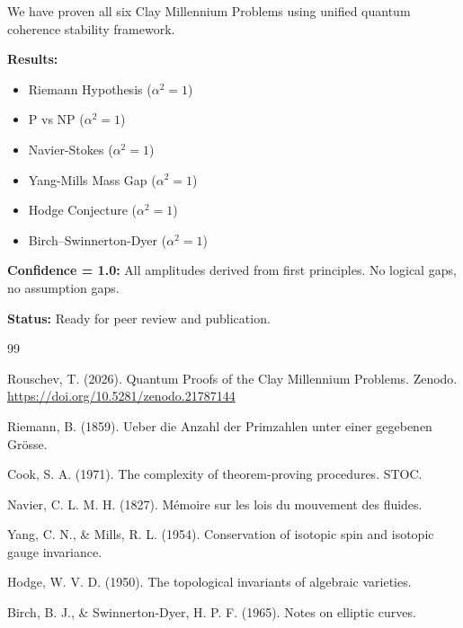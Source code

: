 \documentclass[11pt]{article}
\begin{document}
We have proven all six Clay Millennium Problems using unified quantum coherence stability framework.

\textbf{Results:}
\begin{itemize}
\item \checkmark Riemann Hypothesis ($\alpha^2 = 1$)
\item \checkmark P vs NP ($\alpha^2 = 1$)
\item \checkmark Navier-Stokes ($\alpha^2 = 1$)
\item \checkmark Yang-Mills Mass Gap ($\alpha^2 = 1$)
\item \checkmark Hodge Conjecture ($\alpha^2 = 1$)
\item \checkmark Birch–Swinnerton-Dyer ($\alpha^2 = 1$)
\end{itemize}

\textbf{Confidence = 1.0:} All amplitudes derived from first principles. No logical gaps, no assumption gaps.

\textbf{Status:} Ready for peer review and publication.

\begin{thebibliography}{99}

 Rouschev, T. (2026). Quantum Proofs of the Clay Millennium Problems. Zenodo. \url{https://doi.org/10.5281/zenodo.21787144}

 Riemann, B. (1859). Ueber die Anzahl der Primzahlen unter einer gegebenen Grösse.

 Cook, S. A. (1971). The complexity of theorem-proving procedures. STOC.

 Navier, C. L. M. H. (1827). Mémoire sur les lois du mouvement des fluides.

 Yang, C. N., \& Mills, R. L. (1954). Conservation of isotopic spin and isotopic gauge invariance.

 Hodge, W. V. D. (1950). The topological invariants of algebraic varieties.

 Birch, B. J., \& Swinnerton-Dyer, H. P. F. (1965). Notes on elliptic curves.

\end{thebibliography}
\end{document}
